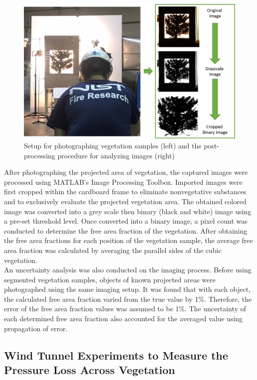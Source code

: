 \documentclass[12pt]{article}
\begin{document}
\begin{figure} [h]
	\centering 	\includegraphics[width=1.0\linewidth]{Picture5.jpg}
	\caption{Setup for photographing vegetation samples (left) and the post-processing procedure for analyzing images (right)}
	\label{fig:ImgAnaly}
\end{figure}

\indent After photographing the projected area of vegetation, the captured images were processed using MATLAB's Image Processing Toolbox. Imported images were first cropped within the cardboard frame to eliminate nonvegetative substances and to exclusively evaluate the projected vegetation area. The obtained colored image was converted into a grey scale then binary (black and white) image using a pre-set threshold level. Once converted into a binary image, a pixel count was conducted to determine the free area fraction of the vegetation. After obtaining the free area fractions for each position of the vegetation sample, the average free area fraction was calculated by averaging the parallel sides of the cubic vegetation.\\
\indent An uncertainty analysis was also conducted on the imaging process. Before using segmented vegetation samples, objects of known projected areas were photographed using the same imaging setup. It was found that with each object, the calculated free area fraction varied from the true value by 1\%. Therefore, the error of the free area fraction values was assumed to be 1\%. The uncertainty of each determined free area fraction also accounted for the averaged value using propagation of error.

\subsection{Wind Tunnel Experiments to Measure the Pressure Loss Across Vegetation}
\label{ssec:headingscap}
\end{document}
